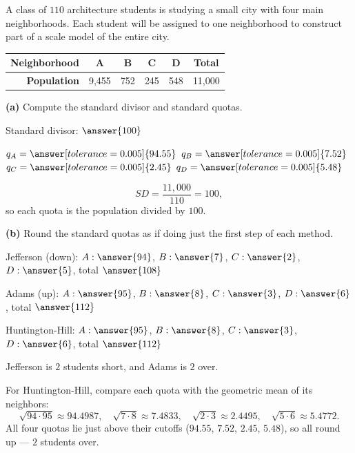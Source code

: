 \documentclass[12pt]{ximera}
\begin{document}
\begin{problem}
A class of $110$ architecture students is studying a small city with four main
neighborhoods. Each student will be assigned to one neighborhood to construct part of a
scale model of the entire city.

\begin{center}
\begin{tabular}{|r|c|c|c|c|c|}\hline
\textbf{Neighborhood} & A & B & C & D & \textbf{Total}\\\hline
\textbf{Population} & 9,455 & 752 & 245 & 548 & 11,000\\\hline
\end{tabular}
\end{center}

\begin{prompt}
\textbf{(a)} Compute the standard divisor and standard quotas.

Standard divisor: $\answer{100}$

\smallskip
$q_A=\answer[tolerance=0.005]{94.55}$ \quad $q_B=\answer[tolerance=0.005]{7.52}$ \quad
$q_C=\answer[tolerance=0.005]{2.45}$ \quad $q_D=\answer[tolerance=0.005]{5.48}$

\begin{feedback}
\[ SD=\frac{11{,}000}{110}=100, \]
so each quota is the population divided by $100$.
\end{feedback}
\end{prompt}

\begin{prompt}
\textbf{(b)} Round the standard quotas as if doing just the first step of each method.

Jefferson (down): $A: \answer{94}$, $B: \answer{7}$, $C: \answer{2}$, $D: \answer{5}$,
total $\answer{108}$

\smallskip
Adams (up): $A: \answer{95}$, $B: \answer{8}$, $C: \answer{3}$, $D: \answer{6}$,
total $\answer{112}$

\smallskip
Huntington-Hill: $A: \answer{95}$, $B: \answer{8}$, $C: \answer{3}$, $D: \answer{6}$,
total $\answer{112}$

\begin{feedback}
Jefferson is $2$ students short, and Adams is $2$ over.

For Huntington-Hill, compare each quota with the geometric mean of its neighbors:
\[
\sqrt{94\cdot95}\approx 94.4987,\quad \sqrt{7\cdot8}\approx 7.4833,\quad
\sqrt{2\cdot3}\approx 2.4495,\quad \sqrt{5\cdot6}\approx 5.4772.
\]
All four quotas lie just above their cutoffs ($94.55$, $7.52$, $2.45$, $5.48$), so all
round up --- $2$ students over.
\end{feedback}
\end{prompt}


\end{problem}
\end{document}
